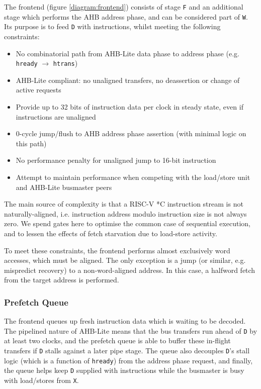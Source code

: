 The frontend (figure \ref{diagram:frontend}) consists of stage {\tt F} and an additional stage which performs the AHB address phase, and can be considered part of {\tt W}. Its purpose is to feed {\tt D} with instructions, whilst meeting the following constraints:

\begin{itemize}
	\item No combinatorial path from AHB-Lite data phase to address phase (e.g. {\tt hready} $\to$ {\tt htrans})
	\item AHB-Lite compliant: no unaligned transfers, no deassertion or change of active requests
	\item Provide up to 32 bits of instruction data per clock in steady state, even if instructions are unaligned
	\item 0-cycle jump/flush to AHB address phase assertion (with minimal logic on this path)
	\item No performance penalty for unaligned jump to 16-bit instruction
	\item Attempt to maintain performance when competing with the load/store unit and AHB-Lite busmaster peers
\end{itemize}

The main source of complexity is that a RISC-V *C instruction stream is not naturally-aligned, i.e. instruction address modulo instruction size is not always zero. We spend gates here to optimise the common case of sequential execution, and to lessen the effects of fetch starvation due to load-store activity.

To meet these constraints, the frontend performs almost exclusively word accesses, which must be aligned. The only exception is a jump (or similar, e.g. mispredict recovery) to a non-word-aligned address. In this case, a halfword fetch from the target address is performed.

\subsubsection{Prefetch Queue}

The frontend queues up fresh instruction data which is waiting to be decoded. The pipelined nature of AHB-Lite means that the bus transfers run ahead of {\tt D} by at least two clocks, and the prefetch queue is able to buffer these in-flight transfers if {\tt D} stalls against a later pipe stage. The queue also decouples {\tt D}'s stall logic (which is a function of {\tt hready}) from the address phase request, and finally, the queue helps keep {\tt D} supplied with instructions while the busmaster is busy with load/stores from {\tt X}.

